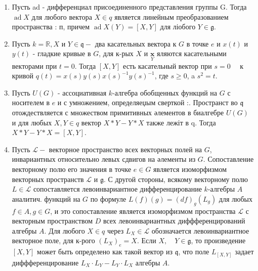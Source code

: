 \documentclass[10pt]{article}
\begin{document}
\begin{enumerate}

  \item Пусть ad - дифференциал присоединенного представления группы G. Тогда $\operatorname{ad} X$ для любого вектора $X \in q$ является линейным преобразованием пространства : п, причем $\operatorname{ad} X(Y)=[X, Y]$ для ліобого $Y \in \mathfrak{g}$.



  \item Пусть $k=\mathbb{R}, X$ и $Y \in \mathfrak{q}-$ два касательных вектора к $G$ в точке $e$ и $x(t)$ и $y(t)$ - гладкие кривые в $G$, для к-рых $X$ и $\underset{Y}{\boldsymbol{x}}$ яляются касательными векторами при $t=0$. Тогда $[X, Y]$ есть касательный вектор при $s=0 \quad$ к кривой $q(t)=x(s) y(s) x(s)^{-1} y(s)^{-1}$, где $s \geqslant 0$, a $s^{2}=t$.



  \item Пусть $U(G)$ - ассоциативная $k$-алгебра обобщенных функций на $G$ с носителем в $e$ и с умножением, определяеџым сверткой :. Пространст во $\mathfrak{q}$ отождествляется с множеством примитивных әлементов в биалгебре $U(G)$ и для любых $X, Y \in q$ вектор $X * Y-Y * X$ также лежіт в q. Тогда $X * Y-Y * X=[X, Y]$.



  \item Пусть $\mathscr{L}-$ векторное пространство всех векторных полей на $G$, инвариантных относительно левых сдвигов на әлементы из $G$. Сопоставление векторному полю его значения в точке $e \in G$ является изоморфизмом векторных пространств $\mathscr{L}$ и $\mathfrak{g}$. С другой стороны, всякому векторному полю $L \in \mathscr{L}$ сопоставляется левоинвариантное дифференцирование $k$-алгебры $A$ аналитич. функций на $G$ по формуле $L(f)(g)=(d f)_{g}\left(L_{g}\right)$ для любых $f \in A, g \in G$, и это сопоставление является изоморфизмом пространства $\mathscr{L}$ с векторным пространством $D$ всех левоинвариантных диффференцирований алгебры $A$. Для любого $X \in q$ через $L_{X} \in \mathscr{L}$ обозначается левоинвариантное векторное поле, для к-рого $\left(L_{X}\right)_{e}=X$. Если $X, \quad Y \in \mathfrak{g}$, то произведение $[X, Y]$ может быть определено как такой вектор из $\mathfrak{q}$, что поле $L_{[X, Y]}$ задает диффференцирование $L_{X} \cdot L_{Y}-L_{Y} \cdot L_{X}$ алгебры $A$.



\end{enumerate}
\end{document}
